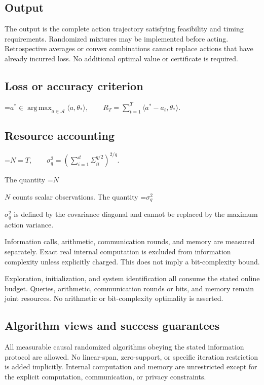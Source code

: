 \documentclass[10pt,a4paper]{article}
\newcommand{\AtlasMath}[1]{\par\begingroup\centering\setbox0=\hbox{$\displaystyle #1$}\ifdim\wd0>1.4\linewidth\typeout{ATLAS WIDE FORMULA: \the\wd0}\fi\ifdim\wd0>\linewidth\resizebox{\linewidth}{!}{\box0}\else\box0\fi\par\endgroup}
\newcommand{\AtlasInlineMath}[1]{\begingroup\setbox0=\hbox{$#1$}\ifdim\wd0>.4\linewidth\endgroup\AtlasMath{#1}\else\endgroup$#1$\fi}
\begin{document}
\subsection{Output}
The output is the complete action trajectory satisfying feasibility and timing requirements. Randomized mixtures may be implemented before acting. Retrospective averages or convex combinations cannot replace actions that have already incurred loss. No additional optimal value or certificate is required.

\subsection{Loss or accuracy criterion}

\AtlasMath{a^*\in\operatorname*{arg\,max}_{a\in\mathcal{A}}\langle a,\theta_*\rangle,\qquad R_T=\sum_{t=1}^{T}\langle a^*-a_t,\theta_*\rangle.}


\subsection{Resource accounting}

\AtlasMath{N=T,\qquad \sigma_q^2=\left(\sum_{i=1}^{d}\Sigma_{ii}^{q/2}\right)^{2/q}.}


The quantity \AtlasInlineMath{N} counts scalar observations. The quantity \AtlasInlineMath{\sigma_q^2} is defined by the covariance diagonal and cannot be replaced by the maximum action variance.

Information calls, arithmetic, communication rounds, and memory are measured separately. Exact real internal computation is excluded from information complexity unless explicitly charged. This does not imply a bit-complexity bound.

Exploration, initialization, and system identification all consume the stated online budget. Queries, arithmetic, communication rounds or bits, and memory remain joint resources. No arithmetic or bit-complexity optimality is asserted.

\subsection{Algorithm views and success guarantees}
All measurable causal randomized algorithms obeying the stated information protocol are allowed. No linear-span, zero-support, or specific iteration restriction is added implicitly. Internal computation and memory are unrestricted except for the explicit computation, communication, or privacy constraints.
\end{document}

